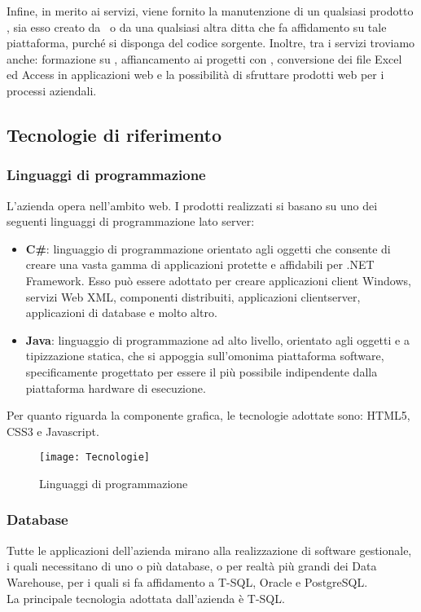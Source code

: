 Infine, in merito ai servizi, viene fornito la manutenzione di un qualsiasi prodotto \inde, sia esso creato da \azienda\ o da una qualsiasi altra ditta che fa affidamento su tale piattaforma, purché si disponga del codice sorgente. Inoltre, tra i servizi troviamo anche: formazione su \inde, affiancamento ai progetti con \inde, conversione dei file Excel ed Access in applicazioni web e la possibilità di sfruttare prodotti web per i processi aziendali.


\subsection{Tecnologie di riferimento}
\label{cap1:Tecnologie di riferimento}
\subsubsection*{Linguaggi di programmazione}

L'azienda opera nell'ambito web. I prodotti realizzati si basano su uno dei seguenti linguaggi di programmazione lato server: 
\begin{itemize}
	\item \textbf{C\#}: linguaggio di programmazione orientato agli oggetti che consente di creare una vasta gamma di applicazioni protette e affidabili per .NET Framework. Esso può essere adottato per creare applicazioni client Windows, servizi Web XML, componenti distribuiti, applicazioni client\-server, applicazioni di database e molto altro.
	
	\item \textbf{Java}: linguaggio di programmazione ad alto livello, orientato agli oggetti e a tipizzazione statica, che si appoggia sull'omonima piattaforma software, specificamente progettato per essere il più possibile indipendente dalla piattaforma hardware di esecuzione.
\end{itemize}

Per quanto riguarda la componente grafica, le tecnologie adottate sono: HTML5, CSS3 e Javascript.

\begin{figure}[!h] 
	\centering 
	\texttt{[image: Tecnologie]} 
	\caption{Linguaggi di programmazione}
\end{figure}

\subsubsection*{Database}
Tutte le applicazioni dell'azienda mirano alla realizzazione di software gestionale, i quali necessitano di uno o più database, o per realtà più grandi dei Data Warehouse, per i quali si fa affidamento a T-SQL, Oracle e PostgreSQL. \\
La principale tecnologia adottata dall'azienda è T-SQL.

